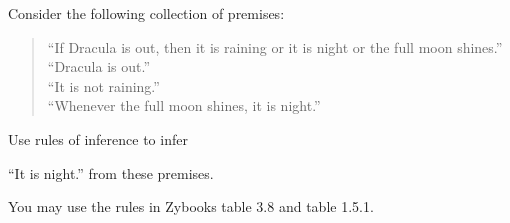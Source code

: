 \documentclass[11pt]{article}
\def\sectionOneA#1{}
\def\sectionOneB#1{}
\def\sectionTwoA#1{}
\def\sectionTwoB#1{}
\def\sectionVicsection#1{#1}
\newcounter{pgpts}
\newcounter{cumpts}
\newcommand{\cnewpage}{\addtocounter{cumpts}{\value{pgpts}}\newpage\setcounter{pgpts}{0}}
\begin{document}
Consider the following collection of premises:
\begin{quote}
\sectionOneA{
``I am smart or I am lucky.''\\
``I am not smart.''\\
  ``If I am lucky then I will win the lottery.''}
\sectionOneB{ %
``I am smart or I am lucky.''\\
``I am not smart.''\\
  ``If I am lucky then I will win the lottery.''}
\sectionTwoA{
``I am lucky then I will win the lottery.''\\
``If I win the lottery then I am smart.''\\
  ``I am not smart.''}
\sectionTwoB{ %
``I am lucky then I will win the lottery.''\\
``If I win the lottery then I am smart.''\\
  ``I am not smart.''}
\sectionVicsection{
``If Dracula is out, then it is raining or it is night or the full moon shines.''\\
``Dracula is out.''\\
``It is not raining.''\\
``Whenever the full moon shines, it is night.''}
\end{quote}
Use rules of inference to infer
\sectionOneA{``I will win the lottery.''}
\sectionOneB{``I will win the lottery.''} %
\sectionTwoA{``I am not lucky.''}
\sectionTwoB{``I am not lucky.''} %
\sectionVicsection{``It is night.''}
from these premises. 

You may use the rules in Zybooks table 3.8 and table 1.5.1.
\cnewpage



\end{document}
